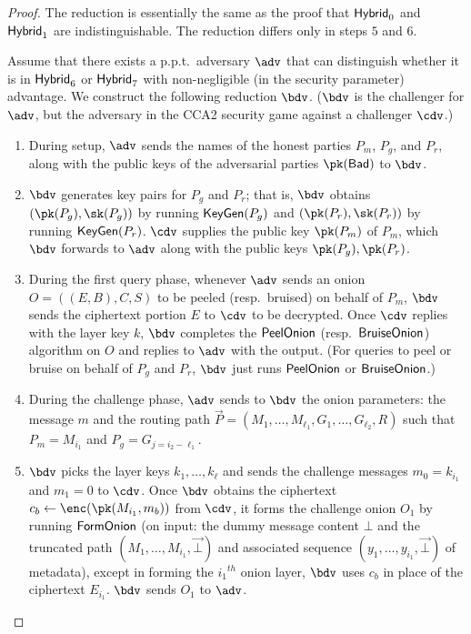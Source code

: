 \documentclass[runningheads,a4paper]{llncs}
\begin{document}
\begin{proof}
The reduction is essentially the same as the proof that $\mathsf{Hybrid}_{0}$ and $\mathsf{Hybrid}_{1}$ are indistinguishable. The reduction differs only in steps $5$ and $6$.   

Assume that there exists a p.p.t.~adversary $\adv$ that can distinguish whether it is in $\mathsf{Hybrid}_{6}$ or $\mathsf{Hybrid}_{7}$ with non-negligible (in the security parameter)  advantage. 
We construct the following reduction $\bdv$. ($\bdv$ is the challenger for $\adv$, but the adversary in the CCA2 security game against a challenger $\cdv$.)

\begin{enumerate}
\item During setup, $\adv$ sends the names of the honest parties $P_m$, $P_g$, and $P_r$, along with the public keys of the adversarial parties $\pk(\Bad)$ to $\bdv$. 

\item $\bdv$ generates key pairs for $P_g$ and $P_r$;
that is, $\bdv$ obtains $(\pk(P_g), \sk(P_g))$ by running $\mathsf{KeyGen}(P_g)$ and $(\pk(P_r), \sk(P_r))$ by running $\mathsf{KeyGen}(P_r)$. 
$\cdv$ supplies the public key $\pk(P_m)$ of $P_m$, which $\bdv$ forwards to $\adv$ along with the public keys $\pk(P_g), \pk(P_r)$. 

\item During the first query phase, whenever $\adv$ sends an onion $O=((E, B), C, S)$ to be peeled (resp.~bruised) on behalf of $P_m$, $\bdv$ sends the ciphertext portion $E$ to $\cdv$ to be decrypted. Once $\cdv$ replies with the layer key $k$, $\bdv$ completes the $\mathsf{PeelOnion}$ (resp.~$\mathsf{BruiseOnion}$) algorithm on $O$ and replies to $\adv$ with the output. (For queries to peel or bruise on behalf of $P_g$ and $P_r$, $\bdv$ just runs $\mathsf{PeelOnion}$ or $\mathsf{BruiseOnion}$.)  

\item During the challenge phase, $\adv$ sends to $\bdv$ the onion parameters: the message $m$ and the routing path $\vec{P} = (M_1, \dots, M_{\ell_1}, G_1, \dots, G_{\ell_2}, R)$ such that $P_m = M_{i_1}$ and $P_g = G_{j=i_2-\ell_1}$. 

\item $\bdv$ picks the layer keys $k_1, \dots, k_\ell$ and sends the challenge messages $m_0 = k_{i_1}$ and $m_1 = 0$ to $\cdv$. Once $\bdv$ obtains the ciphertext $c_b \gets \enc(\pk(M_{i_1}, m_b))$ from $\cdv$, it forms the challenge onion $O_1$ by running $\mathsf{FormOnion}$ (on input: the dummy message content $\bot$ and the truncated path $(M_1, \dots, M_{i_1}, \vec{\bot})$ and associated sequence $(y_1, \dots, y_{i_1}, \vec{\bot})$ of metadata), except in forming the ${i_1}^\mathit{th}$ onion layer, $\bdv$ uses $c_b$ in place of the ciphertext $E_{i_1}$. $\bdv$ sends $O_1$ to $\adv$. 


\end{enumerate}
\end{proof}
\end{document}
